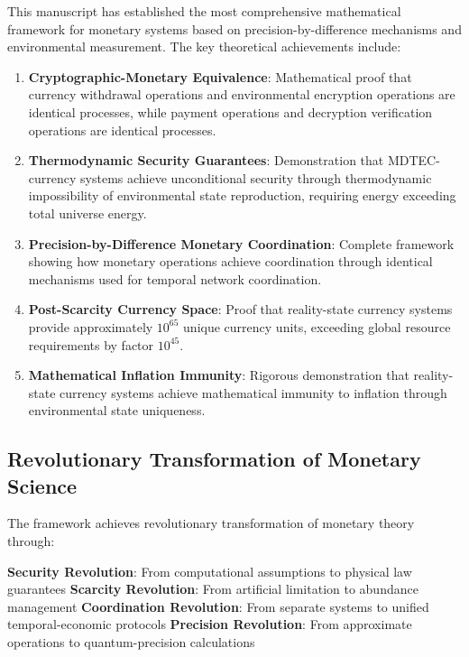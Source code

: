 \documentclass[12pt,a4paper]{article}
\begin{document}
This manuscript has established the most comprehensive mathematical framework for monetary systems based on precision-by-difference mechanisms and environmental measurement. The key theoretical achievements include:

\begin{enumerate}
\item \textbf{Cryptographic-Monetary Equivalence}: Mathematical proof that currency withdrawal operations and environmental encryption operations are identical processes, while payment operations and decryption verification operations are identical processes.

\item \textbf{Thermodynamic Security Guarantees}: Demonstration that MDTEC-currency systems achieve unconditional security through thermodynamic impossibility of environmental state reproduction, requiring energy exceeding total universe energy.

\item \textbf{Precision-by-Difference Monetary Coordination}: Complete framework showing how monetary operations achieve coordination through identical mechanisms used for temporal network coordination.

\item \textbf{Post-Scarcity Currency Space}: Proof that reality-state currency systems provide approximately $10^{65}$ unique currency units, exceeding global resource requirements by factor $10^{45}$.

\item \textbf{Mathematical Inflation Immunity}: Rigorous demonstration that reality-state currency systems achieve mathematical immunity to inflation through environmental state uniqueness.
\end{enumerate}

\subsection{Revolutionary Transformation of Monetary Science}

The framework achieves revolutionary transformation of monetary theory through:

\textbf{Security Revolution}: From computational assumptions to physical law guarantees
\textbf{Scarcity Revolution}: From artificial limitation to abundance management  
\textbf{Coordination Revolution}: From separate systems to unified temporal-economic protocols
\textbf{Precision Revolution}: From approximate operations to quantum-precision calculations
\end{document}
